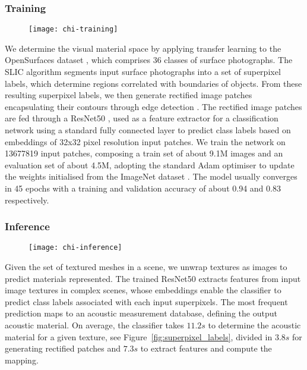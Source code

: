 \subsubsection{Training}
\begin{figure}[htbp]
    \centering
    \texttt{[image: chi-training]}
    \caption{}
    \label{fig:chi-inference}
\end{figure}
We determine the visual material space by applying transfer learning to the OpenSurfaces dataset \cite{bell2013opensurfaces}, which comprises 36 classes of surface photographs. 
The SLIC algorithm \cite{slic6205760} segments input surface photographs into a set of superpixel labels, which determine regions correlated with boundaries of objects. From these resulting superpixel labels, we then generate rectified image patches encapsulating their contours through edge detection \cite{ding2001canny}.
The rectified image patches are fed through a ResNet50 \cite{he2016deep}, used as a feature extractor for a classification network using a standard fully connected layer to predict class labels based on embeddings of 32x32 pixel resolution input patches. We train the network on 13677819 input patches, composing a train set of about 9.1M images and an evaluation set of about 4.5M, adopting the standard Adam optimiser \cite{kingma2014adam} to update the weights initialised from the ImageNet dataset \cite{deng2009imagenet}. The model usually converges in 45 epochs with a training and validation accuracy of about 0.94 and 0.83 respectively. 

\subsubsection{Inference}
\begin{figure}[htbp]
    \centering
    \texttt{[image: chi-inference]}
    \caption{}
    \label{fig:chi-inference}
\end{figure}
Given the set of textured meshes in a scene, we unwrap textures as images to predict materials represented. The trained ResNet50 extracts features from input image textures in complex scenes, whose embeddings enable the classifier to predict class labels associated with each input superpixels. The most frequent prediction maps to an acoustic measurement database, defining the output acoustic material. On average, the classifier takes $11.2s$ to determine the acoustic material for a given texture, see Figure~\ref{fig:superpixel_labels}, divided in $3.8s$ for generating rectified patches and $7.3s$ to extract features and compute the mapping.%


